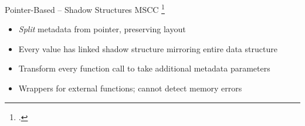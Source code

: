 \documentclass[aspectratio=169]{beamer}
\begin{document}
\begin{frame}{Pointer-Based -- Shadow Structures}
MSCC \footcite{xu_efficient_2004}
\pause
\begin{itemize}
    \item \emph{Split} metadata from pointer, preserving layout 
    \item Every value has linked shadow structure mirroring entire data structure
    \item Transform every function call to take additional metadata parameters
    \item Wrappers for external functions; cannot detect memory errors 
\end{itemize}
\end{frame}
\end{document}
